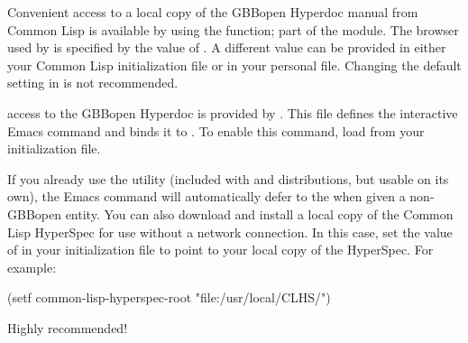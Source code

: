 \documentclass[10pt,twoside,english,pdftex]{article}
\begin{document}
Convenient access to a local copy of the GBBopen Hyperdoc manual from Common
Lisp is available by using the \textbf{} function;
part of the  module. The
browser used by \textbf{} is specified by the value
of .  A different value can be provided in
either your Common Lisp initialization file or in your personal
 file.  Changing the default setting in
 is not recommended.

%
 access to the
GBBopen Hyperdoc is provided by
.  This file defines
the interactive Emacs command  and binds it to
.  To enable this command, load  from
your  initialization file.

If you already use the
utility (included with
 and
distributions, but usable on its own), the Emacs
 command will automatically defer to the
 when
given a non-GBBopen entity.  You can also download and install a local copy of the 
Common Lisp HyperSpec for use without a network connection.  In this case, set the value of  in your  initialization file to point to your local copy of the HyperSpec.  For example:

\begin{example}
  (setf common-lisp-hyperspec-root "file:/usr/local/CLHS/")
\end{example}

Highly recommended!


\W\entities
\T\clearpage
\T\renewcommand{\headrulewidth}{0.01pt}

\end{document}
